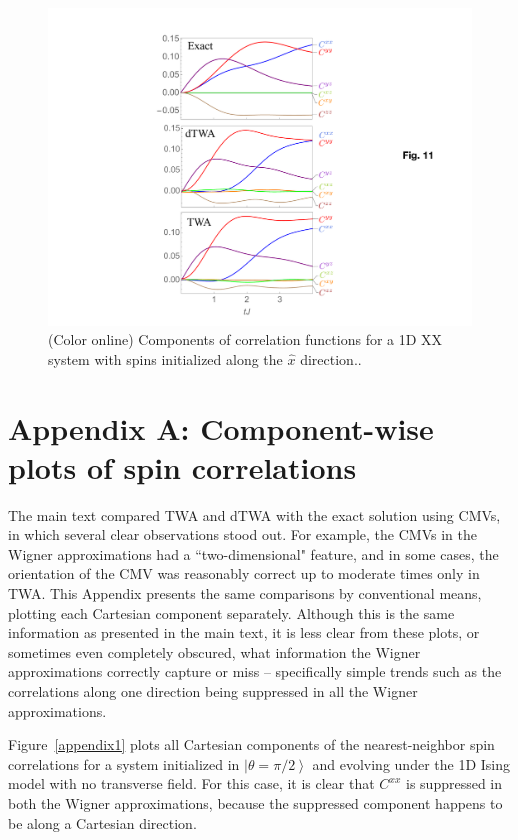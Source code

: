 \documentclass[pra,reprint,superscriptaddress]{revtex4-1}
\newcommand{\ket}[1]{\left| #1 \right\rangle}
\begin{document}
\begin{figure}[h]\centering
 \includegraphics[width = 0.8\columnwidth]{fig11.pdf}
 \caption{(Color online) Components of correlation functions for a 1D XX system with spins initialized along the $\hat{x}$ direction..}
 \label{appendix4}
\end{figure}

\section*{Appendix A: Component-wise plots of spin correlations}\label{sec: component plots}
The main text compared TWA and dTWA with the exact solution using CMVs, in which several clear observations stood out. For example, the CMVs in the Wigner approximations had a ``two-dimensional" feature, and in some cases, the orientation of the CMV was reasonably correct up to moderate times only in TWA. This Appendix presents the same comparisons by conventional means, plotting each Cartesian component separately. Although this is the same information as presented in the main text, it is less clear from these plots, or sometimes even completely obscured, what information the Wigner approximations correctly capture or miss -- specifically simple trends such as the correlations along one direction being suppressed in all the Wigner approximations.

Figure~\ref{appendix1} plots all Cartesian components of the nearest-neighbor spin correlations for a system initialized in $\ket{\theta=\pi/2}$ and evolving under the 1D Ising model with no transverse field. For this case, it is clear that $C^{xx}$ is suppressed in both the Wigner approximations, because the suppressed component happens to be along a Cartesian direction.
\end{document}

